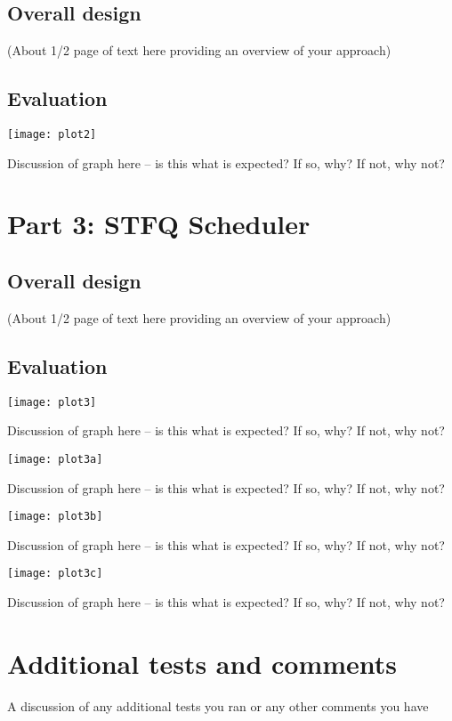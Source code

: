 \documentclass[11pt, letterpaper]{article}
\begin{document}
\subsection{Overall design}

(About 1/2 page of text here providing an overview of your approach)

\subsection{Evaluation}

\centerline{\texttt{[image: plot2]}}

Discussion of graph here -- is this what is expected? If so, why? If not, why not?




\section{Part 3: STFQ Scheduler}

\subsection{Overall design}

(About 1/2 page of text here providing an overview of your approach)

\subsection{Evaluation}

\centerline{\texttt{[image: plot3]}}

Discussion of graph here -- is this what is expected? If so, why? If not, why not?


\centerline{\texttt{[image: plot3a]}}

Discussion of graph here -- is this what is expected? If so, why? If not, why not?


\centerline{\texttt{[image: plot3b]}}

Discussion of graph here -- is this what is expected? If so, why? If not, why not?


\centerline{\texttt{[image: plot3c]}}

Discussion of graph here -- is this what is expected? If so, why? If not, why not?







\section{Additional tests and comments}

A discussion of any additional tests you ran or any other comments you have
\end{document}
